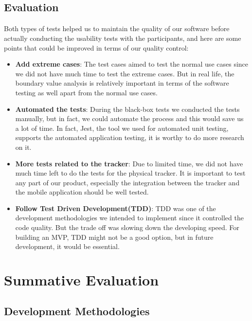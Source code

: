 \documentclass[12pt,a4paper]{article}
\begin{document}
      \subsection{Evaluation} %
        \paragraph{} Both types of tests helped us to maintain the quality of our software before actually conducting the usability tests with the participants, and here are some points that could be improved in terms of our quality control:
        \begin{itemize}
          \item {\bf Add extreme cases}: The test cases aimed to test the normal use cases since we did not have much time to test the extreme cases. But in real life, the boundary value analysis is relatively important in terms of the software testing as well apart from the normal use cases.
          \item {\bf Automated the tests}: During the black-box tests we conducted the tests manually, but in fact, we could automate the process and this would save us a lot of time. In fact, Jest, the tool we used for automated unit testing, supports the automated application testing, it is worthy to do more research on it.
          \item {\bf More tests related to the tracker}: Due to limited time, we did not have much time left to do the tests for the physical tracker. It is important to test any part of our product, especially the integration between the tracker and the mobile application should be well tested.
          \item {\bf Follow Test Driven Development(TDD)}: TDD was one of the development methodologies we intended to implement since it controlled the code quality. But the trade off was slowing down the developing speed. For building an MVP, TDD might not be a good option, but in future development, it would be essential.
        \end{itemize}
       
    \section{Summative Evaluation}
      \subsection{Development Methodologies}
\end{document}
